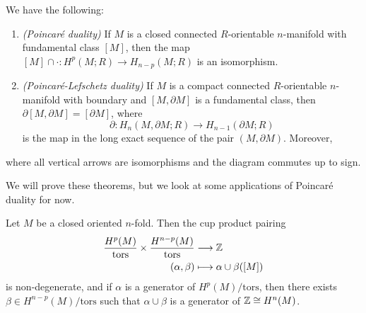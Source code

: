\begin{theorem}
  We have the following:
  \begin{enumerate}
    \item \emph{(Poincar\'e duality)}
      If $M$ is a closed connected
      $R$-orientable $n$-manifold with
      fundamental class $[M]$, then the
      map $[M] \cap \cdot : H^p(M; R) \to H_{n - p}(M; R)$
      is an isomorphism.
    \item \emph{(Poincar\'e-Lefschetz duality)}
      If $M$ is a compact connected
      $R$-orientable $n$-manifold with boundary
      and $[M, \partial M]$ is a fundamental class,
      then $\partial[M, \partial M] = [\partial M]$, where
      \[
        \partial : H_n(M, \partial M; R) \to H_{n - 1}(\partial M; R)
      \]
      is the map in the long exact sequence of
      the pair $(M, \partial M)$. Moreover,
      \begin{center}
        \hspace{-1em}
      \end{center}
  \end{enumerate}
  where all vertical arrows are isomorphisms
  and the diagram commutes up to sign.
\end{theorem}

\begin{remark}
  We will prove these theorems, but we
  look at some applications of Poincar\'e duality
  for now.
\end{remark}

\begin{corollary}
  Let $M$ be a closed oriented $n$-fold.
  Then the cup product pairing
  \begin{align*}
    \frac{H^p(M)}{\mathrm{tors}}
    \times \frac{H^{n - p}(M)}{\mathrm{tors}}
    &\longrightarrow \mathbb{Z} \\
    (\alpha, \beta)
    &\longmapsto \alpha \cup \beta([M])
  \end{align*}
  is non-degenerate, and if $\alpha$ is a
  generator of  $H^p(M) / \mathrm{tors}$, then there
  exists $\beta \in H^{n - p}(M) / \mathrm{tors}$ such that
  $\alpha \cup \beta$ is a generator of
  $\mathbb{Z} \cong H^n(M)$.
\end{corollary}
